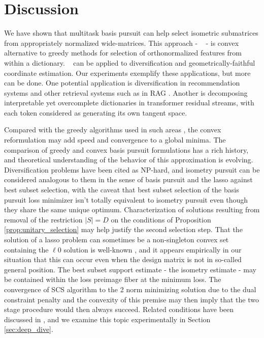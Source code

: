 \section{Discussion}
\label{sec:discussion}

We have shown that multitask basis pursuit can help select isometric submatrices from appropriately normalized wide-matrices.
This approach - \isometrypursuit~ - is convex alternative to greedy methods for selection of orthonormalized features from within a dictionary.
\isometrypursuit~ can be applied to diversification and geometrically-faithful coordinate estimation.
Our experiments exemplify these applications, but more can be done.
One potential application is diversification in recommendation systems \cite{Carbonell2017-gi, Wu2019-uk, Langchain} and other retrieval systems such as in RAG \cite{Gao2023-cn, Pickett2024-ad, In2024-um, Weiss2024-xm, Vectara}.
Another is decomposing interpretable yet overcomplete dictionaries in transformer residual streams, with each token considered as generating its own tangent space.

Compared with the greedy algorithms used in such areas \cite{Carbonell1998-ji, Barioni, Drosou, Qin2012-ok, KUNAVER2017154, Guo-shengbo, Abdool,Yu2016AGA,  Huang2024-wr, Pickett2024-ad}, the convex reformulation may add speed and convergence to a global minima.
The comparison of greedy \cite{Mallat93-wi, Mallat, Pati-93, Tropp05-ml} and convex \cite{Chen2001-hh, Tropp06-sg,Chen2006TheoreticalRO} basis pursuit formulations has a rich history, and theoretical understanding of the behavior of this approximation is evolving.
Diversification problems have been cited as NP-hard, and isometry pursuit can be considered analogous to them in the sense of basis pursuit and the lasso against best subset selection, with the caveat that best subset selection of the basis pursuit loss minimizer isn't totally equivalent to isometry pursuit even though they share the same unique optimum.
Characterization of solutions resulting from removal of the restriction $|S| = D$ on the conditions of Proposition \ref{prop:unitary_selection} may help justify the second selection step.
That the solution of a lasso problem can sometimes be a non-singleton convex set containing the $\ell 0 $ solution is well-known \cite{Osborne2000OnTL, DOSSAL2012117, Chrtien2011OnTG, Tibshirani2012TheLP, Ewald2017OnTD, Ali2018TheGL, Schneider2020-qt, Mishkin2022TheSP,Dupuis2019TheGO,Debarre2020OnTU,Everink2024TheGA}, and it appears empirically in our situation that this can occur even when the design matrix is not in so-called general position.
The best subset support estimate - the isometry estimate - may be contained within the loss preimage fiber at the minimum loss.
The convergence of SCS algorithm to the 2 norm minimizing solution due to the dual constraint penalty and the convexity of this premise may then imply that the two stage procedure would then always succeed.
Related conditions have been discussed in \cite{Donoho2006ForML, Mishkin2022TheSP}, and we examine this topic experimentally in Section \ref{sec:deep_dive}.

